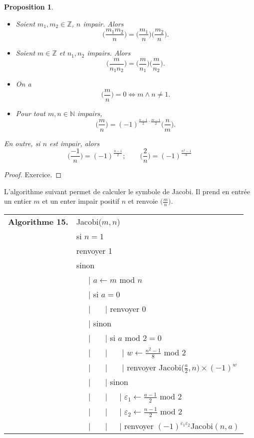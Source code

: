 \documentclass[12pt]{report}
\newtheorem{Prop}[thm]{Proposition}
\begin{document}
\begin{Prop}\
\begin{itemize}
\item[$1)$] Soient $m_1,m_2 \in \mathbb{Z}$, $n$ impair. Alors $$\Big(  \frac{m_1 m_2}{n}\Big)= \Big(  \frac{m_1}{n}\Big) \Big(  \frac{m_2}{n}\Big). $$
\item[$2)$] Soient $m \in \mathbb{Z}$ et $n_1,n_2$ impairs. Alors 
$$    \Big(  \frac{m}{n_1 n_2}\Big)= \Big(  \frac{m}{n_1}\Big)\Big(  \frac{m}{n_2}\Big) .  $$
\item[$3)$] On a
$$     \Big(  \frac{m}{n}\Big)=0 \Longleftrightarrow m\wedge n \neq 1    .$$
\item[$4)$] Pour tout $m,n \in \mathbb{N}$ impairs, 
$$   \Big(  \frac{m}{n}\Big)= (-1)^{\tfrac{n-1}{2}\cdot \tfrac{m-1}{2} } \Big(  \frac{n}{m}\Big) .   $$
\end{itemize}
En outre, si $n$ est impair, alors 
$$   \Big(  \frac{-1}{n}\Big)= (-1)^{\tfrac{n-1}{2}} ; \qquad  \Big(  \frac{2}{n}\Big)= (-1)^{\tfrac{n^2-1}{8}}  $$    
\end{Prop}

\begin{proof}
Exercice.
\end{proof}


L'algorithme suivant permet de calculer le symbole de Jacobi. Il prend en entrée un entier $m$ et un enter impair positif $n$ et renvoie $ \big( \tfrac{m}{n} \big)$.\\

\begin{tabular}{ll}
\textbf{Algorithme 15.} & Jacobi($m,n$)\\
           & si $n= 1$ \\
           & renvoyer 1 \\
           & sinon \\
           & \ \ \ {\rm |} $a \leftarrow m$ mod $n$ \\
           & \ \ \ {\rm |} si $a=0$  \\
           & \ \ \ {\rm |} \ \ \ {\rm |} renvoyer 0 \\
           &  \ \ \ {\rm |} sinon  \\
           & \ \ \ {\rm |} \ \ \ {\rm |} si $a$ mod 2$=0$ \\
           & \ \ \ {\rm |} \ \ \ {\rm |} \ \ \ {\rm|} $w \leftarrow \tfrac{n^2-1}{8}$ mod $2$ \\
           & \ \ \ {\rm |} \ \ \ {\rm |} \ \ \ {\rm |} renvoyer Jacobi($\tfrac{a}{2},n)\times (-1)^w$ \\           
           & \ \ \ {\rm |} \ \ \ {\rm |} sinon \\
           & \ \ \ {\rm |} \ \ \ {\rm |}\ \ \ {\rm |} $ \varepsilon_1   \leftarrow \tfrac{a-1}{2}$ mod $2$ \\
           & \ \ \ {\rm |} \ \ \ {\rm |}\ \ \ {\rm |} $ \varepsilon_2   \leftarrow \tfrac{n-1}{2}$ mod $2$ \\
           & \ \ \ {\rm |} \ \ \ {\rm |}\ \ \ {\rm |} renvoyer $(-1)^{\varepsilon_1 \varepsilon_2}$Jacobi$(n,a)$
\end{tabular}\\
\end{document}
